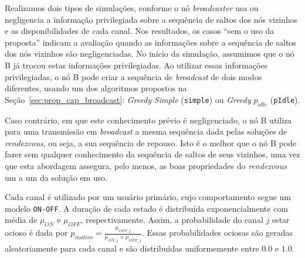
Realizamos dois tipos de simulações, conforme o nó {\it broadcaster} usa ou negligencia a informação privilegiada sobre a sequência de saltos dos nós vizinhos e as disponibilidades de cada canal. Nos resultados, os casos ``sem o uso da proposta'' indicam a avaliação quando as informações sobre a sequência de saltos dos nós vizinhos são negligenciadas. No início da simulação, assumimos que o nó B já trocou estas informações privilegiadas. Ao utilizar essas informações privilegiadas, o nó B pode criar a sequência de {\it broadcast} de dois modos diferentes, usando um dos algoritmos propostos na Seção~\ref{sec:prop_cap_broadcast}: {\it Greedy} {\it Simple} ({\tt simple}) ou {\it Greedy} $p_{idle}$ ({\tt pIdle}).

Caso contrário, em que este conhecimento prévio é negligenciado, o nó B utiliza para uma transmissão em {\it broadcast} a mesma sequência dada pelas soluções de {\it rendezvous}, ou seja, a sua sequência de repouso. Isto é o melhor que o nó B pode fazer sem qualquer conhecimento da sequência de saltos de seus vizinhos, uma vez que esta abordagem assegura, pelo menos, as boas propriedades do {\it rendezvous} um a um da solução em uso.



Cada canal é utilizado por um usuário primário, cujo comportamento segue um modelo {\tt ON-OFF}. A duração de cada estado é distribuída exponencialmente com média de $\mu_{ON}$ e $\mu_{OFF}$, respectivamente. Assim, a probabilidade do canal $j$ estar ocioso é dada por $p_{inativo} = \frac {\mu_{OFF,j}} {\mu_{ON,j} + \mu_{OFF,j}}$. Essas probabilidades ociosas são geradas aleatoriamente para cada canal e são distribuídas uniformemente entre $0.0$ e $1.0$.


